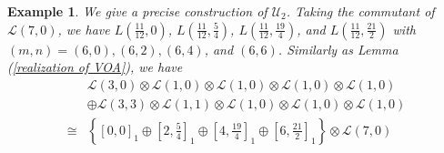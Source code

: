 \documentclass{article}
\newtheorem{example}[lemma]{Example}
\begin{document}



\begin{example}\label{U2}
We give a precise construction of $\mathcal{U}_2$.
Taking the commutant of $\mathcal{L}(7,0)$,
we have
$L(\frac{11}{12},0)$, $L(\frac{11}{12},\frac{5}{4})$, $L(\frac{11}{12},\frac{19}{4})$, and $L(\frac{11}{12},\frac{21}{2})$ 
with $(m,n)=(6,0),(6,2),(6,4)$, and $(6,6)$.
Similarly as Lemma (\ref{realization of VOA}), we have
\begin{equation*}
\begin{aligned}
&\mathcal{L}\left(3,0\right)\otimes\mathcal{L}\left(1,0\right)\otimes\mathcal{L}\left(1,0\right)\otimes\mathcal{L}\left(1,0\right)\otimes\mathcal{L}\left(1,0\right)\\
&\oplus\mathcal{L}\left(3,3\right)\otimes\mathcal{L}\left(1,1\right)\otimes\mathcal{L}\left(1,0\right)\otimes\mathcal{L}\left(1,0\right)\otimes\mathcal{L}\left(1,0\right)\\
\cong&\left\{\left[0,0\right]_1\oplus\left[2,\frac{5}{4}\right]_1\oplus\left[4,\frac{19}{4}\right]_1\oplus\left[6,\frac{21}{2}\right]_1\right\}\otimes\mathcal{L}\left(7,0\right)\\

\end{aligned}
\end{equation*}
\end{example}
\end{document}
